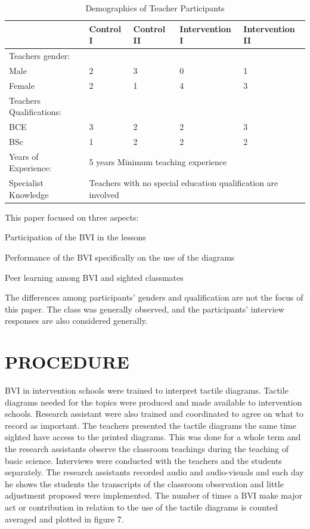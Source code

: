 \documentclass[11.5pt]{sig-alternate} %
\begin{document}
\begin{large}
\begin{table}[!t]
\caption{Demographics of Teacher Participants}
\begin{tabular}{|l|l|l|l|l|}
\hline
& \textbf{Control I} & \textbf{Control II} & \textbf{Intervention I} & \textbf{Intervention II} \\ \hline
Teachers gender: & & & & \\
Male & 2 & 3 & 0 & 1 \\
Female & 2 & 1 & 4 & 3 \\ \hline
Teachers Qualifications: & & & & \\ 
BCE & 3 & 2 & 2 & 3 \\ 
BSc & 1 & 2 & 2 & 2 \\ \hline
Years of Experience: & \multicolumn{4}{l|}{5 years Minimum teaching experience} \\ \hline
Specialist Knowledge & \multicolumn{4}{l|}{Teachers with no special education qualification are involved} \\ \hline
\end{tabular}
\end{table}

This paper focused on three aspects:

Participation of the BVI in the lessons
 
Performance of the BVI specifically on the use of the diagrams

Peer learning among BVI and sighted classmates

The differences among participants’ genders and qualification are not the focus of this paper. The class was generally observed, and the participants’ interview responses are also considered generally.

\section*{PROCEDURE}
BVI in intervention schools were trained to interpret tactile diagrams. Tactile diagrams needed for the topics were produced and made available to intervention schools. Research assistant were also trained and coordinated to agree on what to record as important. The teachers presented the tactile diagrams the same time sighted have access to the printed diagrams. This was done for a whole term and the research assistants observe the classroom teachings during the teaching of basic science. Interviews were conducted with the teachers and the students separately. The research assistants recorded audio and audio-visuals and each day he shows the students the transcripts of the classroom observation and little adjustment proposed were implemented. The number of times a BVI make major act or contribution in relation to the use of the tactile diagrams is counted averaged and plotted in figure 7.  


\end{large}
\end{document}
